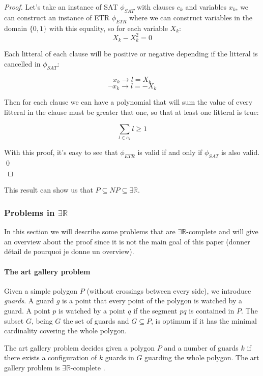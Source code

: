 \begin{proof}
  Let's take an instance of SAT $\phi_{SAT}$ with clauses $c_k$ and variables
  $x_k$, we can construct an instance of ETR $\phi_{ETR}$ where we can
  construct variables in the domain $\{0,1\}$ with this equality, so for each
  variable $X_k$:
  $$X_k - X_k^2 = 0$$

  Each litteral of each clause will be positive or negative depending if the litteral is cancelled in $\phi_{SAT}$:

  $$x_k \to l = X_k$$
  $$\neg x_k \to l = -X_k$$

  Then for each clause we can have a polynomial that will sum the value of every litteral in the clause must be greater that one, so that at least one litteral is true:

  $$\sum_{l\in c_k} l \geq 1$$

  With this proof, it's easy to see that $\phi_{ETR}$ is valid if and only if $\phi_{SAT}$ is also valid.  \qed\\

\end{proof}

This result can show us that $P \subseteq NP \subseteq \exists \mathbb{R}$.

\subsubsection{Problems in $\exists \mathbb{R}$}

In this section we will describe some problems that are $\exists
\mathbb{R}$-complete and will give an overview about the proof since it is
not the main goal of this paper (donner détail de pourquoi je donne un
overview).

\paragraph{The art gallery problem} Given a simple polygon $P$ (without
crossings between every side), we introduce \textit{guards}. A guard $g$ is
a point that every point of the polygon is watched by a guard. A point
$p$ is watched by a point $q$ if the segment $pq$ is contained in $P$. The
subset $G$, being $G$ the set of guards and $G \subseteq P$, is optimum if it
has the minimal cardinality covering the whole polygon.

The art gallery problem decides given a polygon $P$ and a number of guards $k$
if there exists a configuration of $k$ guards in $G$ guarding the whole
polygon. The art gallery problem is $\exists \mathbb{R}$-complete
\cite{abrahamsenArtGalleryProblem2017}.

